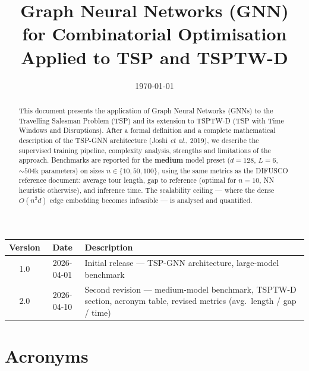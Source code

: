 \documentclass[12pt,a4paper]{article}
\title{%
  \LARGE\textbf{Graph Neural Networks (GNN)}\\[0.4em]
  \large for Combinatorial Optimisation\\[0.6em]
  \normalsize Applied to TSP and TSPTW-D
}
\date{\today}
\begin{document}

\maketitle
\thispagestyle{empty}

\begin{center}
\small
\begin{tabularx}{\linewidth}{ccX}
\toprule
\textbf{Version} & \textbf{Date} & \textbf{Description} \\
\midrule
1.0 & 2026-04-01 & Initial release --- TSP-GNN architecture, large-model benchmark \\
2.0 & 2026-04-10 & Second revision --- medium-model benchmark, TSPTW-D section,
                   acronym table, revised metrics (avg.\ length / gap / time) \\
\bottomrule
\end{tabularx}
\end{center}

\begin{abstract}
This document presents the application of Graph Neural Networks (GNNs) to the
Travelling Salesman Problem (TSP) and its extension to TSPTW-D (TSP with Time
Windows and Disruptions).
After a formal definition and a complete mathematical description of the TSP-GNN
architecture (Joshi \textit{et al.}, 2019), we describe the supervised training
pipeline, complexity analysis, strengths and limitations of the approach.
Benchmarks are reported for the \textbf{medium} model preset ($d=128$, $L=6$,
${\sim}504\mathrm{k}$ parameters) on sizes $n \in \{10, 50, 100\}$, using the
same metrics as the DIFUSCO reference document: average tour length, gap to
reference (optimal for $n=10$, NN heuristic otherwise), and inference time.
The scalability ceiling --- where the dense $O(n^2 d)$ edge embedding becomes
infeasible --- is analysed and quantified.
\end{abstract}

\tableofcontents
\newpage


\section*{Acronyms}
\end{document}
